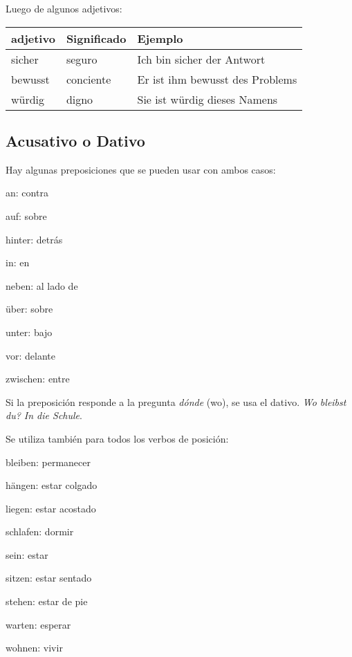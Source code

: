 Luego de algunos adjetivos:

\begin{tabular}{| l | l | l |}
\hline
\textbf{adjetivo} & \textbf{Significado} & \textbf{Ejemplo}\\
\hline
sicher & seguro & Ich bin sicher der Antwort\\
bewusst & conciente & Er ist ihm bewusst des Problems\\
würdig & digno & Sie ist würdig dieses Namens\\
\hline
\end{tabular}

\subsection{Acusativo o Dativo}
Hay algunas preposiciones que se pueden usar con ambos casos:
\begin{multicols}{3}
\begin{myitemize}
\item an: contra
\item auf: sobre
\item hinter: detrás
\item in: en
\item neben: al lado de
\item über: sobre
\item unter: bajo
\item vor: delante
\item zwischen: entre
\end{myitemize}
\end{multicols}

Si la preposición responde a la pregunta \textit{dónde} (wo), se usa el dativo. \textit{Wo bleibst du? In die Schule}. 

Se utiliza también para todos los verbos de posición:
\begin{multicols}{3}
\begin{myitemize}
\item bleiben: permanecer
\item hängen: estar colgado
\item liegen: estar acostado
\item schlafen: dormir
\item sein: estar
\item sitzen: estar sentado
\item stehen: estar de pie
\item warten: esperar
\item wohnen: vivir
\end{myitemize}
\end{multicols}

